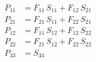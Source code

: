 \begin{align}
P_{11} &= F_{11}\,S_{11}+F_{12}\,S_{21} \\ 
P_{21} &= F_{21}\,S_{11}+F_{22}\,S_{21} \\ 
P_{12} &= F_{11}\,S_{12}+F_{12}\,S_{22} \\ 
P_{22} &= F_{21}\,S_{12}+F_{22}\,S_{22} \\ 
P_{33} &= S_{33} 
\end{align}
